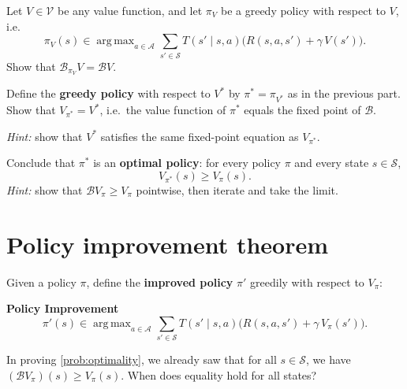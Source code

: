 \documentclass[11pt]{article}
\newcommand{\cS}{\mathcal{S}}
\newcommand{\cA}{\mathcal{A}}
\DeclareMathOperator*{\argmax}{arg\,max}
\begin{document}

\begin{exercise}
\label{prob:greedy_equals_B} Let $V \in \mathcal{V}$ be any value function, and let $\pi_V$ be a greedy policy with respect to $V$, i.e.\
$$
\pi_V(s) \in \argmax_{a \in \cA} \sum_{s' \in \cS} T(s' \mid s, a)\bigl(R(s,a,s') + \gamma\, V(s')\bigr).
$$
Show that $\mathcal{B}_{\pi_V} V = \mathcal{B} V$.
\end{exercise}


\begin{exercise}
\label{prob:V_pi_star} Define the \textbf{greedy policy} with respect to $V^*$ by $\pi^* = \pi_{V^*}$ as in the previous part.
Show that $V_{\pi^*} = V^*$, i.e.\ the value function of $\pi^*$ equals the fixed point of $\mathcal{B}$.

\textit{Hint:} show that $V^*$ satisfies the same fixed-point equation as $V_{\pi^*}$.
\end{exercise}


\begin{exercise}
\label{prob:optimality} Conclude that $\pi^*$ is an \textbf{optimal policy}: for every policy $\pi$ and every state $s \in \cS$,
$$
V_{\pi^*}(s) \ge V_\pi(s).
$$
\textit{Hint:} show that $\mathcal{B} V_\pi \ge V_\pi$ pointwise, then iterate and take the limit.
\end{exercise}




\section{Policy improvement theorem}\label{prob:policy_improvement}

Given a policy $\pi$, define the \textbf{improved policy} $\pi'$ greedily with respect to $V_\pi$:

\begin{callout}[note]
\textbf{Policy Improvement}
$$
\pi'(s) \in \argmax_{a \in \cA} \sum_{s' \in \cS} T(s' \mid s, a)\bigl(R(s,a,s') + \gamma\, V_\pi(s')\bigr).
$$
\end{callout}

\begin{exercise}
\label{prob:when_equality} In proving \cref{prob:optimality}, we already saw that for all $s \in \cS$, we have
$(\mathcal{B} V_\pi)(s) \ge V_\pi(s)$.
When does equality hold for all states?
\end{exercise}
\end{document}
